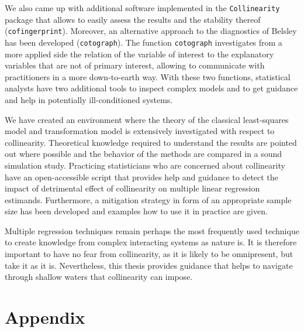 \documentclass[11pt,a4paper,twoside]{book}\usepackage[]{graphicx}\usepackage[]{xcolor}
\begin{document}
We also came up with additional software implemented in the \texttt{Collinearity} package that allows to easily assess the results and the stability thereof (\texttt{cofingerprint}).
Moreover, an alternative approach to the diagnostics of Belsley has been developed (\texttt{cotograph}). The function \texttt{cotograph} investigates from a more applied side the relation of the variable of interest to the explanatory variables that are not of primary interest, allowing to communicate with practitioners in a more down-to-earth way.
With these two functions, statistical analysts have two additional tools to inspect complex models and to get guidance and help in potentially ill-conditioned systems. 

We have created an environment where the theory of the classical least-squares model and transformation model is extensively investigated with respect to collinearity.
Theoretical knowledge required to understand the results are pointed out where possible and the behavior of the methods are compared in a sound simulation study.
Practicing statisticians who are concerned about collinearity have an open-accessible script that provides help and guidance to detect the impact of detrimental effect of collinearity on multiple linear regression estimands.
Furthermore, a mitigation strategy in form of an appropriate sample size has been developed and examples how to use it in practice are given.

Multiple regression techniques remain perhaps the most frequently used technique to create knowledge from complex interacting systems as nature is. It is therefore important to have no fear from collinearity, as it is likely to be omnipresent, but take it as it is.
Nevertheless, this thesis provides guidance that helps to navigate through shallow waters that collinearity can impose.




\appendix




\chapter{Appendix}

\end{document}
